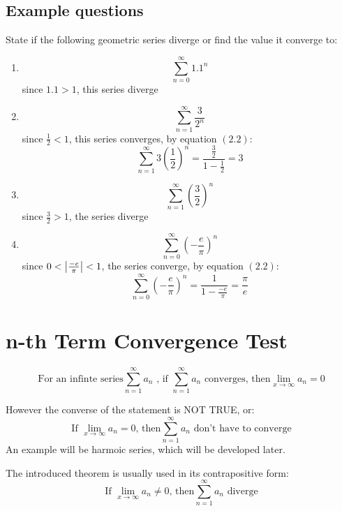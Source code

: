 \documentclass{article}
\numberwithin{equation}{section}
\begin{document}
\newpage

\subsection{Example questions}
State if the following geometric series diverge or find the value it converge to:
\begin{enumerate}
    \item \[\sum_{n = 0}^\infty 1.1^n \]
    since $1.1 > 1$, this series diverge

    \item \[\sum_{n = 1}^\infty \frac{3}{2^n} \]
    since $\frac{1}{2} < 1$, this series converges, by equation $(2.2)$:
    \[
    \sum_{n = 1}^{\infty} 3(\frac{1}{2})^n = \frac{\frac{3}{2}}{1-\frac{1}{2}} = 3
    \]

    \item \[\sum_{n = 1}^{\infty} \left(\frac{3}{2} \right)^n \]
    since $\frac{3}{2} > 1$, the series diverge

    \item  \[\sum_{n = 0}^{\infty} \left( -\frac{e}{\pi}\right)^n\]
    since $0 < \abs{\frac{-e}{\pi}} < 1$, the series converge, by equation $(2.2)$:
    \[
        \sum_{n = 0}^{\infty} \left( -\frac{e}{\pi}\right)^n = \frac{1}{1 - \frac{-e}{\pi}} = \frac{\pi}{e}
    \]
\end{enumerate}

\newpage
\section{n-th Term Convergence Test}

\begin{equation}
    \text{For an infinte series} \sum_{n = 1}^{\infty} a_n \text{ , if }\sum_{n = 1}^{\infty} a_n \text{ converges, then} \lim_{x\to \infty} a_n = 0 
\end{equation}

However the converse of the statement is NOT TRUE, or:
\begin{equation}
    \text{If } \lim_{x\to \infty} a_n = 0  \text{, then} \sum_{n = 1}^{\infty} a_n \text{ don't have to converge}
\end{equation}
An example will be harmoic series, which will be developed later.

The introduced theorem is usually used in its contrapositive form:
\begin{equation}
    \text{If } \lim_{x\to \infty} a_n \neq 0  \text{, then} \sum_{n = 1}^{\infty} a_n \text{ diverge}
\end{equation}
\end{document}
